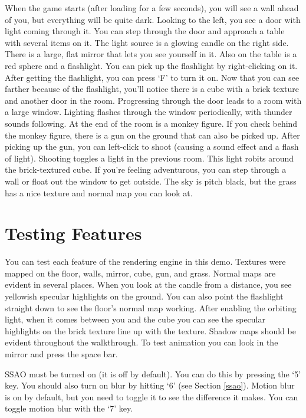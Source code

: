 \documentclass[oneside]{book}
\begin{document}
    When the game starts (after loading for a few seconds), you will see a wall ahead of you, but everything will be quite dark. Looking to the left, you see a door with light coming through it. You can step through the door and approach a table with several items on it. The light source is a glowing candle on the right side. There is a large, flat mirror that lets you see yourself in it. Also on the table is a red sphere and a flashlight. You can pick up the flashlight by right-clicking on it. After getting the flashlight, you can press `F' to turn it on. Now that you can see farther because of the flashlight, you'll notice there is a cube with a brick texture and another door in the room. Progressing through the door leads to a room with a large window. Lighting flashes through the window periodically, with thunder sounds following. At the end of the room is a monkey figure. If you check behind the monkey figure, there is a gun on the ground that can also be picked up. After picking up the gun, you can left-click to shoot (causing a sound effect and a flash of light). Shooting toggles a light in the previous room. This light robits around the brick-textured cube. If you're feeling adventurous, you can step through a wall or float out the window to get outside. The sky is pitch black, but the grass has a nice texture and normal map you can look at.

  \section{Testing Features}
    You can test each feature of the rendering engine in this demo. Textures were mapped on the floor, walls, mirror, cube, gun, and grass. Normal maps are evident in several places. When you look at the candle from a distance, you see yellowish specular highlights on the ground. You can also point the flashlight straight down to see the floor's normal map working. After enabling the orbiting light, when it comes between you and the cube you can see the specular highlights on the brick texture line up with the texture. Shadow maps should be evident throughout the walkthrough. To test animation you can look in the mirror and press the space bar.

    SSAO must be turned on (it is off by default). You can do this by pressing the `5' key. You should also turn on blur by hitting `6' (see Section \ref{ssao}).
    Motion blur is on by default, but you need to toggle it to see the difference it makes. You can toggle motion blur with the `7' key.
\end{document}
